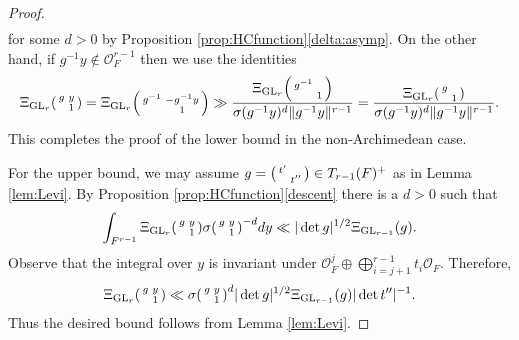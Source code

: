 \documentclass[12pt]{amsart}
\theoremstyle{remark}
\numberwithin{equation}{section}
\newcommand{\GL}{\mathrm{GL}}
\newcommand{\OO}{\mathcal{O}}
\theoremstyle{definition}
\newenvironment{psmatrix}
  {\left(\begin{smallmatrix}}
  {\end{smallmatrix}\right)}
\numberwithin{equation}{subsection}
\newcommand{\norm}[1]{\lVert#1\rVert}
\begin{document}
\begin{proof}
\begin{align*}
\end{align*}
for some $d>0$ by Proposition \ref{prop:HCfunction}\ref{delta:asymp}. 
On the other hand, if $g^{-1}y \not \in \OO_F^{r-1}$ then we use the identities
\begin{align} \label{inverses}
    \Xi_{\GL_r}\begin{psmatrix} g & y \\&1\end{psmatrix}= \Xi_{\GL_r}\begin{psmatrix} g^{-1} & -g^{-1}y \\&1\end{psmatrix}\gg \frac{\Xi_{\GL_r}\begin{psmatrix} g^{-1} &  \\ & 1\end{psmatrix}}{\sigma(g^{-1}y)^{d}\norm{g^{-1}y}^{r-1}}=\frac{\Xi_{\GL_r}\begin{psmatrix} g &  \\ & 1\end{psmatrix}}{\sigma(g^{-1}y)^{d}\norm{g^{-1}y}^{r-1}}.
\end{align}
This completes the proof of the lower bound in the non-Archimedean case.

For the upper bound, we may assume $g=\begin{psmatrix}t' & \\ & t''\end{psmatrix}\in T_{r-1}(F)^+$ as in Lemma \ref{lem:Levi}. By Proposition \ref{prop:HCfunction}\ref{descent} there is a $d>0$ such that
\begin{align*}
    \int_{F^{r-1}}\Xi_{\GL_r}\begin{psmatrix}
        g & y \\
        & 1
    \end{psmatrix}\sigma\begin{psmatrix}
        g  & y \\
         & 1
    \end{psmatrix}^{-d}dy\ll |\det g|^{1/2}\Xi_{\GL_{r-1}}(g).
\end{align*}
Observe that the integral over $y$ is invariant under $\mathcal{O}_F^{j}\oplus \bigoplus_{i=j+1}^{r-1} t_i\mathcal{O}_F.$ Therefore,
\begin{align*}
    \Xi_{\GL_{r}}\begin{psmatrix}
        g & y \\
        & 1
    \end{psmatrix}\ll  \sigma\begin{psmatrix}
        g  & y \\
         & 1
    \end{psmatrix}^{d}|\det g|^{1/2}\Xi_{\GL_{r-1}}(g)|\det t''|^{-1}.
\end{align*}
Thus the desired bound follows from Lemma \ref{lem:Levi}.


\end{proof}
\end{document}
